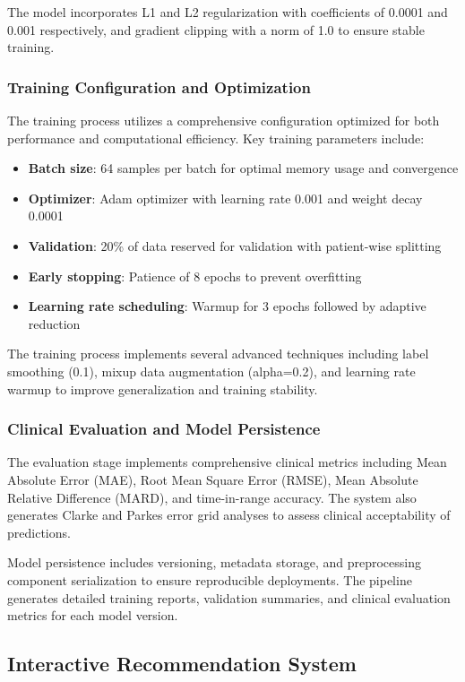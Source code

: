 \documentclass[acmsmall]{acmart}
\begin{document}
The model incorporates L1 and L2 regularization with coefficients of 0.0001 and 0.001 respectively, and gradient clipping with a norm of 1.0 to ensure stable training.

\subsubsection{Training Configuration and Optimization}

The training process utilizes a comprehensive configuration optimized for both performance and computational efficiency. Key training parameters include:
\begin{itemize}
  \item \textbf{Batch size}: 64 samples per batch for optimal memory usage and convergence
  \item \textbf{Optimizer}: Adam optimizer with learning rate 0.001 and weight decay 0.0001
  \item \textbf{Validation}: 20\% of data reserved for validation with patient-wise splitting
  \item \textbf{Early stopping}: Patience of 8 epochs to prevent overfitting
  \item \textbf{Learning rate scheduling}: Warmup for 3 epochs followed by adaptive reduction
\end{itemize}

The training process implements several advanced techniques including label smoothing (0.1), mixup data augmentation (alpha=0.2), and learning rate warmup to improve generalization and training stability.

\subsubsection{Clinical Evaluation and Model Persistence}

The evaluation stage implements comprehensive clinical metrics including Mean Absolute Error (MAE), Root Mean Square Error (RMSE), Mean Absolute Relative Difference (MARD), and time-in-range accuracy. The system also generates Clarke and Parkes error grid analyses to assess clinical acceptability of predictions.

Model persistence includes versioning, metadata storage, and preprocessing component serialization to ensure reproducible deployments. The pipeline generates detailed training reports, validation summaries, and clinical evaluation metrics for each model version.

\subsection{Interactive Recommendation System}
\end{document}
